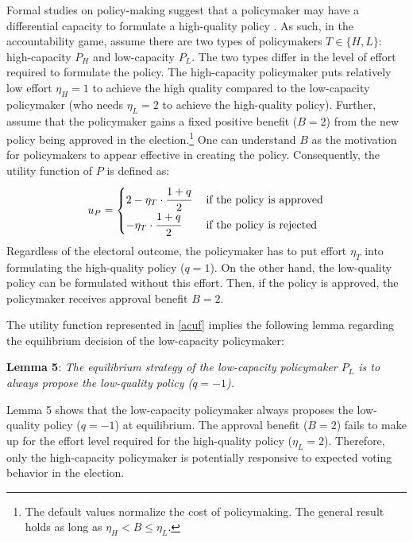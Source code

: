 \documentclass[doc,natbib,12pt]{apa6}
\begin{document}
	\par Formal studies on policy-making suggest that a policymaker may have a differential capacity to formulate a high-quality policy \cite[e.g.,][]{Gailmard2007slan, Huber2004buca}. As such, in the accountability game, assume there are two types of policymakers $T \in \{H, L\}$: high-capacity $P_H$ and low-capacity $P_L$. The two types differ in the level of effort required to formulate the policy. The high-capacity policymaker puts relatively low effort $\eta_H = 1$ to achieve the high quality compared to the low-capacity policymaker (who needs $\eta_L = 2$ to achieve the high-quality policy). Further, assume that the policymaker gains a fixed positive benefit ($B=2$) from the new policy being approved in the election.\footnote{The default values normalize the cost of policymaking. The general result holds as long as $\eta_H < B \leq \eta_L$.} One can understand $B$ as the motivation for policymakers to appear effective in creating the policy. Consequently, the utility function of $P$ is defined as:
	\begin{align}
	u_P = \begin{cases}
	2 - \eta_T \cdot \cfrac{1+q}{2} &\text{ if the policy is approved} \\
	- \eta_T \cdot \cfrac{1+q}{2} &\text{ if the policy is rejected} \\
	\end{cases} \label{acuf}
	\end{align}
	\noindent Regardless of the electoral outcome, the policymaker has to put effort $\eta_T$ into formulating the high-quality policy ($q=1$). On the other hand, the low-quality policy can be formulated without this effort. Then, if the policy is approved, the policymaker receives approval benefit $B=2$. 
	
	\par The utility function represented in \autoref{acuf} implies the following lemma regarding the equilibrium decision of the low-capacity policymaker:
	
	\noindent \textbf{Lemma 5}: \textit{The equilibrium strategy of the low-capacity policymaker $P_L$ is to always propose the low-quality policy ($q=-1$).}
	
	\noindent Lemma 5 shows that the low-capacity policymaker always proposes the low-quality policy ($q=-1$) at equilibrium. The approval benefit ($B=2$) fails to make up for the effort level required for the high-quality policy ($\eta_L=2$). Therefore, only the high-capacity policymaker is potentially responsive to expected voting behavior in the election. 
	
\end{document}
